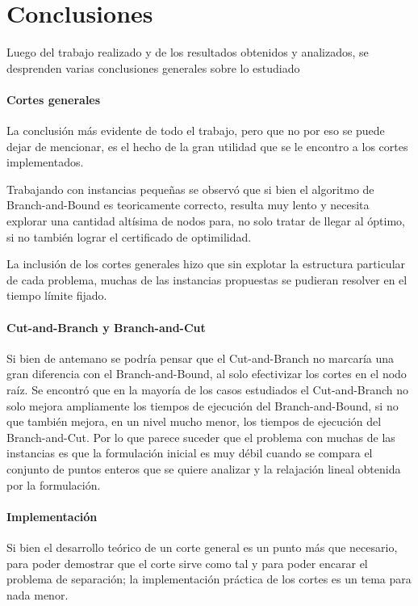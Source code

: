 \section{Conclusiones}


Luego del trabajo realizado y de los resultados obtenidos y analizados, se desprenden varias conclusiones generales sobre lo estudiado

\medskip
\paragraph{Cortes generales}
La conclusi\'on m\'as evidente de todo el trabajo, pero que no por eso se puede dejar de mencionar, es el hecho de la gran utilidad que se le encontro a los cortes implementados.

Trabajando con instancias peque\~nas se observ\'o que si bien el algoritmo de Branch-and-Bound es teoricamente correcto, resulta muy lento y necesita explorar una cantidad alt\'isima de nodos para, no solo tratar de llegar al \'optimo, si no tambi\'en lograr el certificado de optimilidad.

La inclusi\'on de los cortes generales hizo que sin explotar la estructura particular de cada problema, muchas de las instancias propuestas se pudieran resolver en el tiempo l\'imite fijado.

\medskip
\paragraph{Cut-and-Branch y Branch-and-Cut}

Si bien de antemano se podr\'ia pensar que el Cut-and-Branch no marcar\'ia una gran diferencia con el Branch-and-Bound, al solo efectivizar los cortes en el nodo ra\'iz. Se encontr\'o que en la mayor\'ia de los casos estudiados el Cut-and-Branch no solo mejora ampliamente los tiempos de ejecuci\'on del Branch-and-Bound, si no que tambi\'en mejora, en un nivel mucho menor, los tiempos de ejecuci\'on del Branch-and-Cut. Por lo que parece suceder que el problema con muchas de las instancias es que la formulaci\'on inicial es muy d\'ebil cuando se compara el conjunto de puntos enteros que se quiere analizar y la relajaci\'on lineal obtenida por la formulaci\'on.


\medskip
\paragraph{Implementaci\'on}

Si bien el desarrollo te\'orico de un corte general es un punto m\'as que necesario, para poder demostrar que el corte sirve como tal y para poder encarar el problema de separaci\'on; la implementaci\'on pr\'actica de los cortes es un tema para nada menor. 

